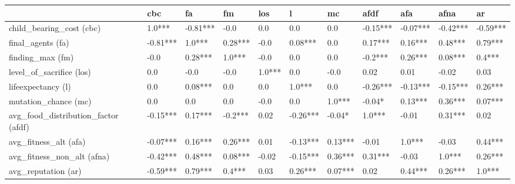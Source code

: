 \begin{tabular}{lllllllllll}
\toprule
{} &       cbc &        fa &       fm &     los &         l &       mc &      afdf &       afa &      afna &        ar \\
\midrule
child\_bearing\_cost (cbc)            &    1.0*** &  -0.81*** &     -0.0 &     0.0 &       0.0 &      0.0 &  -0.15*** &  -0.07*** &  -0.42*** &  -0.59*** \\
final\_agents (fa)                   &  -0.81*** &    1.0*** &  0.28*** &    -0.0 &   0.08*** &      0.0 &   0.17*** &   0.16*** &   0.48*** &   0.79*** \\
finding\_max (fm)                    &      -0.0 &   0.28*** &   1.0*** &    -0.0 &       0.0 &      0.0 &   -0.2*** &   0.26*** &   0.08*** &    0.4*** \\
level\_of\_sacrifice (los)            &       0.0 &      -0.0 &     -0.0 &  1.0*** &       0.0 &     -0.0 &      0.02 &      0.01 &     -0.02 &      0.03 \\
lifeexpectancy (l)                  &       0.0 &   0.08*** &      0.0 &     0.0 &    1.0*** &      0.0 &  -0.26*** &  -0.13*** &  -0.15*** &   0.26*** \\
mutation\_chance (mc)                &       0.0 &       0.0 &      0.0 &    -0.0 &       0.0 &   1.0*** &    -0.04* &   0.13*** &   0.36*** &   0.07*** \\
avg\_food\_distribution\_factor (afdf) &  -0.15*** &   0.17*** &  -0.2*** &    0.02 &  -0.26*** &   -0.04* &    1.0*** &     -0.01 &   0.31*** &      0.02 \\
avg\_fitness\_alt (afa)               &  -0.07*** &   0.16*** &  0.26*** &    0.01 &  -0.13*** &  0.13*** &     -0.01 &    1.0*** &     -0.03 &   0.44*** \\
avg\_fitness\_non\_alt (afna)          &  -0.42*** &   0.48*** &  0.08*** &   -0.02 &  -0.15*** &  0.36*** &   0.31*** &     -0.03 &    1.0*** &   0.26*** \\
avg\_reputation (ar)                 &  -0.59*** &   0.79*** &   0.4*** &    0.03 &   0.26*** &  0.07*** &      0.02 &   0.44*** &   0.26*** &    1.0*** \\
\bottomrule
\end{tabular}
